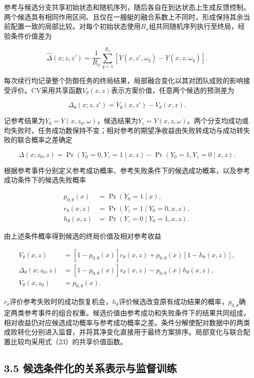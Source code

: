 \documentclass[UTF8,a4paper,zihao=5,fontset=none]{ctexart}
\begin{document}
参考与候选分支共享初始状态和随机序列，随后各自在到达状态上生成反馈控制。两个候选具有相同作用区间、且仅在一艘艇的融合系数上不同时，形成保持其余当前配置一致的局部比较。对每个初始状态使用\(R_x\)组共同随机序列执行至终局，经验条件价值差为

\[
\widehat\Delta(x;z,z')
=\frac1{R_x}\sum_{q=1}^{R_x}
\left[Y(x,z',\omega_q)-Y(x,z,\omega_q)\right].
\tag{22}
\]

每次续行均记录整个防御任务的终局结果，局部融合变化以其对团队成败的影响接受评价。CV采用共享函数\(V_\theta(x,z)\)表示方案价值，任意两个候选的预测差为

\[
\Delta_\theta(x;z,z')=V_\theta(x,z')-V_\theta(x,z).
\tag{23}
\]

记参考结果为\(Y_0=Y(x,z_0,\omega)\)，候选结果为\(Y_z=Y(x,z,\omega)\)。两个分支均成功或均失败时，任务成功数保持不变；相对参考的期望净收益由失败转成功与成功转失败的联合概率之差确定

\[
\Delta(x;z_0,z)
=\Pr(Y_0=0,Y_z=1\mid x,z)
-\Pr(Y_0=1,Y_z=0\mid x,z).
\tag{24}
\]

根据参考事件分别定义参考成功概率、参考失败条件下的候选成功概率，以及参考成功条件下的候选失败概率

\[
\begin{aligned}
p_{0,\theta}(x)&=\Pr(Y_0=1\mid x),\\
r_\theta(x,z)&=\Pr(Y_z=1\mid Y_0=0,x,z),\\
h_\theta(x,z)&=\Pr(Y_z=0\mid Y_0=1,x,z).
\end{aligned}
\tag{25}
\]

由上述条件概率得到候选的终局价值及相对参考收益

\[
\begin{aligned}
V_\theta(x,z)
&=[1-p_{0,\theta}(x)]r_\theta(x,z)
+p_{0,\theta}(x)[1-h_\theta(x,z)],\\
\Delta_\theta(x;z_0,z)
&=[1-p_{0,\theta}(x)]r_\theta(x,z)
-p_{0,\theta}(x)h_\theta(x,z),\\
V_\theta(x,z_0)&=p_{0,\theta}(x).
\end{aligned}
\tag{26}
\]

\(r_\theta\)评价参考失败时的成功恢复机会，\(h_\theta\)评价候选改变原有成功结果的概率，\(p_{0,\theta}\)确定两类参考事件的组合权重。候选价值由参考成功和失败条件下的结果共同组成，相对收益仍对应候选成功概率与参考成功概率之差。条件分解使配对数据中的两类成败转化分别进入监督，并将其净变化直接用于最终方案排序。局部变化与联合配置比较均采用式（23）的共享价值函数。

\subsection*{3.5 候选条件化的关系表示与监督训练}
\end{document}
